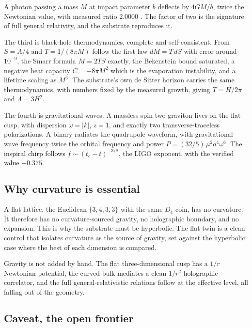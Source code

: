 \begin{result}
A photon passing a mass $M$ at impact parameter $b$ deflects by $4GM/b$, twice the Newtonian value, with measured
ratio $2.0000$ \cite{pollard2026vibetest}. The factor of two is the signature of full general relativity, and the
substrate reproduces it.
\end{result}

The third is black-hole thermodynamics, complete and self-consistent. From $S = A/4$ and $T = 1/(8\pi M)$ follow
the first law $dM = T\, dS$ with error around $10^{-9}$, the Smarr formula $M = 2TS$ exactly, the Bekenstein
bound saturated, a negative heat capacity $C = -8\pi M^2$ which is the evaporation instability, and a lifetime
scaling as $M^3$. The substrate's own de Sitter horizon carries the same thermodynamics, with numbers fixed by
the measured growth, giving $T = H/2\pi$ and $\Lambda = 3H^2$.

The fourth is gravitational waves. A massless spin-two graviton lives on the flat cusp, with dispersion
$\omega = |k|$, $z = 1$, and exactly two transverse-traceless polarizations. A binary radiates the quadrupole
waveform, with gravitational-wave frequency twice the orbital frequency and power
$P = (32/5)\,\mu^2 a^4 \omega^6$. The inspiral chirp follows $f \sim (t_c - t)^{-3/8}$, the LIGO exponent, with
the verified value $-0.375$.

\subsection{Why curvature is essential}

A flat lattice, the Euclidean $\{3,4,3,3\}$ with the same $D_4$ coin, has no curvature. It therefore has no
curvature-sourced gravity, no holographic boundary, and no expansion. This is why the substrate must be
hyperbolic. The flat twin is a clean control that isolates curvature as the source of gravity, set against the
hyperbolic case where the best of each dimension is compared.


Gravity is not added by hand. The flat three-dimensional cusp has a $1/r$ Newtonian potential, the curved bulk
mediates a clean $1/r^2$ holographic correlator, and the full general-relativistic relations follow at the
effective level, all falling out of the geometry.

\subsection{Caveat, the open frontier}

